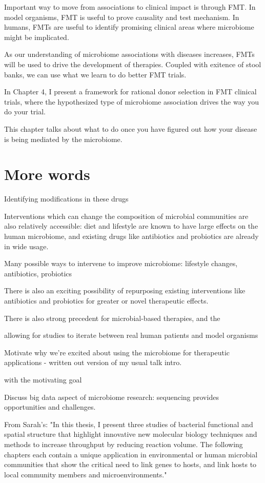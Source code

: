 Important way to move from associations to clinical impact is through FMT. In model organisms, FMT is useful to prove causality and test mechanism. In humans, FMTs are useful to identify promising clinical areas where microbiome might be implicated.

As our understanding of microbiome associations with diseases increases, FMTs will be used to drive the development of therapies. Coupled with exitence of stool banks, we can use what we learn to do better FMT trials.

In Chapter 4, I present a framework for rational donor selection in FMT clinical trials, where the hypothesized type of microbiome association drives the way you do your trial.

This chapter talks about what to do once you have figured out how your disease is being mediated by the microbiome.

\section{More words}

Identifying modifications in these drugs

Interventions which can change the composition of microbial communities are also relatively accessible: diet and lifestyle are known to have large effects on the human microbiome, and existing drugs like antibiotics and probiotics are already in wide usage.

Many possible ways to intervene to improve microbiome: lifestyle changes, antibiotics, probiotics

There is also an exciting possibility of repurposing existing interventions like antibiotics and probiotics for greater or novel therapeutic effects.

There is also strong precedent for microbial-based therapies, and the

allowing for studies to iterate between real human patients and model organisms

Motivate why we're excited about using the microbiome for therapeutic applications - written out version of my usual talk intro.

with the motivating goal

Discuss big data aspect of microbiome research: sequencing provides opportunities and challenges.

From Sarah's: "In this thesis, I present three studies of bacterial functional and spatial structure that highlight innovative new molecular biology techniques and methods to increase throughput by reducing reaction volume. The following chapters each contain a unique application in environmental or human microbial communities that show the critical need to link genes to hosts, and link hosts to local community members and microenvironments."


\begin{singlespace}


\end{singlespace}
